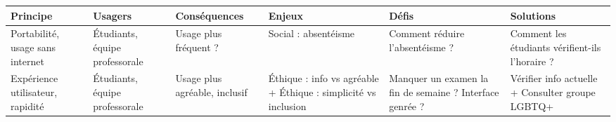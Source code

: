 \begin{tabular}{P{0.15\textwidth}P{0.15\textwidth}P{0.15\textwidth}P{0.15\textwidth}P{0.15\textwidth}P{0.15\textwidth}}
	\hline
	\bf Principe & \bf Usagers & \bf Conséquences & \bf Enjeux & \bf Défis & \bf Solutions \\
	\hline
	\hline
	Portabilité, usage sans internet
	& Étudiants, équipe professorale
	& Usage plus fréquent ?
	& Social : absentéisme
	& Comment réduire l'absentéisme ?
	& Comment les étudiants vérifient-ils l'horaire ?
	\\
	Expérience utilisateur, rapidité
	& Étudiants, équipe professorale
	& Usage plus agréable, inclusif
	& Éthique : info vs agréable + Éthique : simplicité vs inclusion
	& Manquer un examen la fin de semaine ? Interface genrée ?
	& Vérifier info actuelle + Consulter groupe LGBTQ+
	\\
	\hline
\end{tabular}
